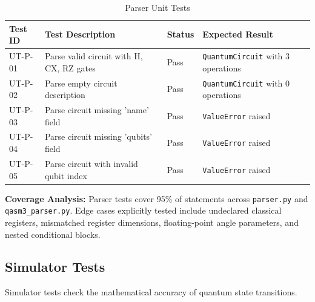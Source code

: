 \begin{table}[h!]
\centering
\caption{Parser Unit Tests}
\label{tab:parser_tests}
\begin{tabular}{|p{2cm}|p{5cm}|p{2cm}|p{3.5cm}|}
\hline
\textbf{Test ID} & \textbf{Test Description} & \textbf{Status} & \textbf{Expected Result} \\
\hline
UT-P-01 & Parse valid circuit with H, CX, RZ gates & Pass & \texttt{QuantumCircuit} with 3 operations \\
\hline
UT-P-02 & Parse empty circuit description & Pass & \texttt{QuantumCircuit} with 0 operations \\
\hline
UT-P-03 & Parse circuit missing 'name' field & Pass & \texttt{ValueError} raised \\
\hline
UT-P-04 & Parse circuit missing 'qubits' field & Pass & \texttt{ValueError} raised \\
\hline
UT-P-05 & Parse circuit with invalid qubit index & Pass & \texttt{ValueError} raised \\
\hline
\end{tabular}
\end{table}

\textbf{Coverage Analysis:} Parser tests cover 95\% of statements across \texttt{parser.py} and \texttt{qasm3\_parser.py}. Edge cases explicitly tested include undeclared classical registers, mismatched register dimensions, floating-point angle parameters, and nested conditional blocks.

\subsection{Simulator Tests}
Simulator tests check the mathematical accuracy of quantum state transitions.

